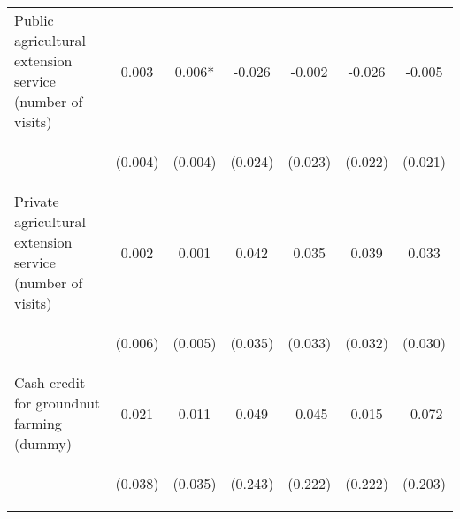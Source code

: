 \begin{center}
\begin{tabular}{lcccccc}
Public agricultural extension service (number of visits) & 0.003 & 0.006* & -0.026 & -0.002 & -0.026 & -0.005 \\
\vspace{4pt} & \begin{footnotesize}(0.004)\end{footnotesize} & \begin{footnotesize}(0.004)\end{footnotesize} & \begin{footnotesize}(0.024)\end{footnotesize} & \begin{footnotesize}(0.023)\end{footnotesize} & \begin{footnotesize}(0.022)\end{footnotesize} & \begin{footnotesize}(0.021)\end{footnotesize} \\
Private agricultural extension service (number of visits) & 0.002 & 0.001 & 0.042 & 0.035 & 0.039 & 0.033 \\
\vspace{4pt} & \begin{footnotesize}(0.006)\end{footnotesize} & \begin{footnotesize}(0.005)\end{footnotesize} & \begin{footnotesize}(0.035)\end{footnotesize} & \begin{footnotesize}(0.033)\end{footnotesize} & \begin{footnotesize}(0.032)\end{footnotesize} & \begin{footnotesize}(0.030)\end{footnotesize} \\
Cash credit for groundnut farming (dummy) & 0.021 & 0.011 & 0.049 & -0.045 & 0.015 & -0.072 \\
\vspace{4pt} & \begin{footnotesize}(0.038)\end{footnotesize} & \begin{footnotesize}(0.035)\end{footnotesize} & \begin{footnotesize}(0.243)\end{footnotesize} & \begin{footnotesize}(0.222)\end{footnotesize} & \begin{footnotesize}(0.222)\end{footnotesize} & \begin{footnotesize}(0.203)\end{footnotesize} \\

\end{tabular}
\end{center}
